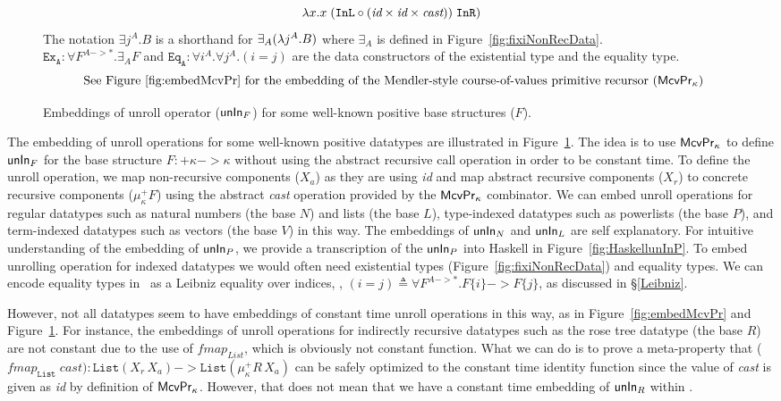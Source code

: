 {\begin{landscape}
\begin{figure}
\[\lambda x. x \;(\texttt{InL}\circ
		(\textit{id}\times\textit{id}\times\textit{cast}))
	\;\texttt{InR})
\]
The notation $\exists j^A.B$ is a shorthand for $\exists_A(\lambda j^A.B)$
where $\exists_A$ is defined in Figure~\ref{fig:fixiNonRecData}.\\
$\mathtt{Ex_{A}} : \forall F^{A -> *}.\exists_A F$ and
$\mathtt{Eq_{A}} : \forall i^A.\forall j^A.(i=j)$ are
the data constructors of the existential type and the equality type.
\[\text{
See Figure \ref{fig:embedMcvPr} for the embedding of the Mendler-style
course-of-values primitive recursor ($\mathsf{McvPr}_\kappa$)}
\]
\caption{Embeddings of unroll operator ($\mathsf{unIn}_F$)
	for some well-known positive base structures ($F$).}
\label{fig:unInExamples}
\end{figure}

\end{landscape}
} %


The embedding of unroll operations for some well-known positive datatypes
are illustrated in Figure~\ref{fig:unInExamples}. The idea is to use
$\mathsf{McvPr}_\kappa$ to define $\mathsf{unIn}_F$ for the base structure
$F:+\kappa -> \kappa$ without using the abstract recursive call operation
in order to be constant time. To define the unroll operation, we map
non-recursive components ($X_a$) as they are using \textit{id} and map
abstract recursive components ($X_r$) to concrete recursive components
($\mu^{+}_\kappa F$) using the abstract \textit{cast} operation provided
by the $\mathsf{McvPr}_\kappa$ combinator. We can embed unroll operations
for regular datatypes such as natural numbers (the base $N$) and lists
(the base $L$), type-indexed datatypes such as powerlists (the base $P$),
and term-indexed datatypes such as vectors (the base $V$) in this way.
The embeddings of $\mathsf{unIn}_N$ and $\mathsf{unIn}_L$ are self explanatory.
For intuitive understanding of the embedding of $\mathsf{unIn}_P$, we provide
a transcription of the $\mathsf{unIn}_P$ into Haskell in Figure~\ref{fig:HaskellunInP}.
To embed unrolling operation for indexed datatypes we would often need
existential types (Figure~\ref{fig:fixiNonRecData}) and equality types.
We can encode equality types in \Fixi\ as a Leibniz equality over indices, \ie,
$(i=j) \triangleq \forall F^{A -> *}.F\{i\} -> F\{j\}$, as discussed in
\S\ref{Leibniz}.

However, not all datatypes seem to have embeddings of constant time 
unroll operations in this way, as in Figure~\ref{fig:embedMcvPr} and
Figure~\ref{fig:unInExamples}. For instance, the embeddings of
unroll operations for indirectly recursive datatypes such as
the rose tree datatype (the base $R$) are not constant due to the
use of $\textit{fmap}_\textit{List}$, which is obviously not constant
function. What we can do is to prove a meta-property that 
($\textit{fmap}_\texttt{List}\;\textit{cast}) : \texttt{List}(X_r\,X_a)
-> \texttt{List}(\mu^{+}_\kappa R\,X_a)$ can be safely optimized
to the constant time identity function since the value of \textit{cast}
is given as \textit{id} by definition of $\mathsf{McvPr}_\kappa$. However, that does
not mean that we have a constant time embedding of $\mathsf{unIn}_R$ within \Fixi.

